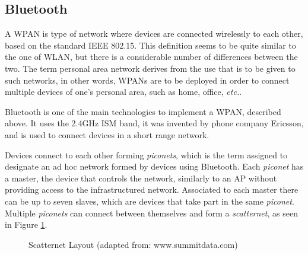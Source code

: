 \subsection{Bluetooth}
\label{subsection:bt}

A \gls{WPAN} is type of network where devices are connected wirelessly to each other, based on the standard IEEE 802.15. This definition seems to be quite similar to the one of \gls{WLAN}, but there is a considerable number of differences between the two. The term personal area network derives from the use that is to be given to such networks, in other words, \glspl{WPAN} are to be deployed in order to connect multiple devices of one's personal area, such as home, office, \textit{etc.}.

Bluetooth is one of the main technologies to implement a \gls{WPAN}, described above. It uses the 2.4GHz \gls{ISM} band, it was invented by phone company Ericsson, and is used to connect devices in a short range network.

Devices connect to each other forming \textit{piconets}, which is the term assigned to designate an ad hoc network formed by devices using Bluetooth. Each \textit{piconet} has a master, the device that controls the network, similarly to an \gls{AP} without providing access to the infrastructured network. Associated to each master there can be up to seven slaves, which are devices that take part in the same \textit{piconet}. Multiple \textit{piconets} can connect between themselves and form a \textit{scatternet}, as seen in Figure \ref{fig:bluetooth}.

\begin{figure}[ht]
	\noindent{}
	\caption{\label{fig:bluetooth} Scatternet Layout (adapted from: www.summitdata.com)}
\end{figure}


